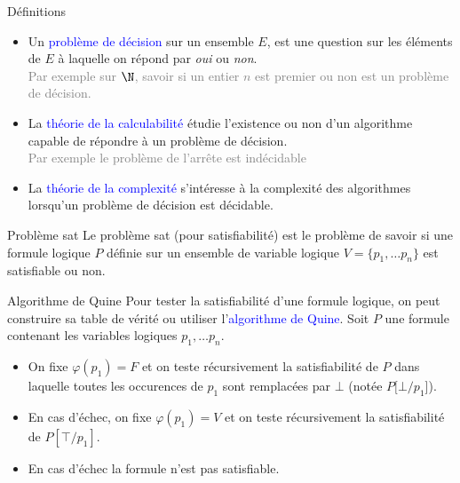 \documentclass[10pt]{beamer}
\begin{document}
\begin{frame}{\Ctitle}{\stitle}
\begin{block}{Définitions}
    \begin{itemize}
		\item<1-> Un \textcolor{blue}{problème de décision} sur un ensemble $E$, est une question sur les éléments de $E$ à laquelle on répond par \textit{oui} ou \textit{non}.\\
		\textcolor{gray}{Par exemple sur $\N$, savoir si un entier $n$ est premier ou non est un problème de décision.}
		\item<2-> La \textcolor{blue}{théorie de la calculabilité} étudie l'existence ou non d'un algorithme capable de répondre à un problème de décision.\\
		\textcolor{gray}{Par exemple le problème de l'arrête est indécidable}
		\item<3-> La \textcolor{blue}{théorie de la complexité} s'intéresse à la complexité des algorithmes lorsqu'un problème de décision est décidable.		
	\end{itemize}
\end{block}
\end{frame}

\begin{frame}{\Ctitle}{\stitle}
	\begin{alertblock}{Problème {\sc sat}}
		Le problème {\sc sat} (pour satisfiabilité) est le problème de savoir si une formule logique $P$ définie sur un ensemble de variable logique $V = \{p_1, \dots p_n\}$ est satisfiable ou non.
	\end{alertblock}
\end{frame}



\begin{frame}{\Ctitle}{\stitle}
    \begin{alertblock}{Algorithme de Quine}
    Pour tester la satisfiabilité d'une formule logique, on peut construire sa table de vérité ou utiliser l'\textcolor{blue}{algorithme de Quine}. Soit $P$ une formule contenant les variables logiques $p_1, \dots p_n$.
    \begin{itemize}
        \item On fixe $\varphi(p_1) = F$ et on teste récursivement la satisfiabilité de $P$ dans laquelle toutes les occurences de $p_1$ sont remplacées par $\bot$ (notée $P[\bot/p_1$]).
        \item En cas d'échec,  on fixe $\varphi(p_1) = V$ et on teste récursivement la satisfiabilité de $P[\top/p_1]$.
        \item En cas d'échec la formule n'est pas satisfiable.
    \end{itemize}
\end{alertblock}
\end{frame}
\end{document}
